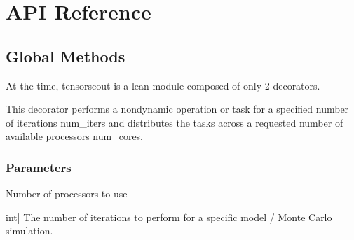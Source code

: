 \documentclass[letterpaper,10pt,english]{sphinxmanual}
\begin{document}
\section{API Reference}
\label{\detokenize{api:api-reference}}\label{\detokenize{api::doc}}

\subsection{Global Methods}
\label{\detokenize{api:global-methods}}
\sphinxAtStartPar
At the time, tensorscout is a lean module composed of only 2 decorators.

\begin{fulllineitems}
\label{\detokenize{api:tensorscout.multicarlo}}
\pysigstartsignatures
{}
\pysigstopsignatures
\sphinxAtStartPar
This decorator performs a non\sphinxhyphen{}dynamic operation or task for a specified number of iterations num\_iters and distributes the tasks across a requested number of available processors num\_cores.


\subsubsection{Parameters}
\label{\detokenize{api:parameters}}\begin{description}
\sphinxAtStartPar
Number of processors to use

\sphinxlineitem{num\_iters}{[}int{]}
\sphinxAtStartPar
The number of iterations to perform for a specific model / Monte Carlo simulation.

\end{description}

\end{fulllineitems}

\end{document}
